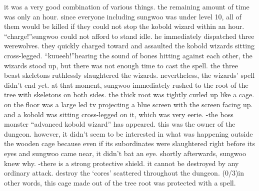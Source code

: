  it was a very good combination of various things.
 the remaining amount of time was only an hour.
since everyone including sungwoo was under level 10, all of them would be killed if they could not stop the kobold wizard within an hour.
“charge!”sungwoo could not afford to stand idle.
 he immediately dispatched three werewolves.
they quickly charged toward and assaulted the kobold wizards sitting cross-legged.
“kuueeh!”hearing the sound of bones hitting against each other, the wizards stood up, but there was not enough time to cast the spell.
the three beast skeletons ruthlessly slaughtered the wizards.
 nevertheless, the wizards’ spell didn’t end yet.
at that moment, sungwoo immediately rushed to the root of the tree with skeletons on both sides.
 the thick root was tightly curled up like a cage.
 on the floor was a large led tv projecting a blue screen with the screen facing up.
 and a kobold was sitting cross-legged on it, which was very eerie.
-the boss monster “advanced kobold wizard” has appeared.
this was the owner of the dungeon.
 however, it didn’t seem to be interested in what was happening outside the wooden cage because even if its subordinates were slaughtered right before its eyes and sungwoo came near, it didn’t bat an eye.
shortly afterwards, sungwoo knew why.
-there is a strong protective shield.
it cannot be destroyed by any ordinary attack.
 destroy the ‘cores’ scattered throughout the dungeon.
 (0/3)in other words, this cage made out of the tree root was protected with a spell.


